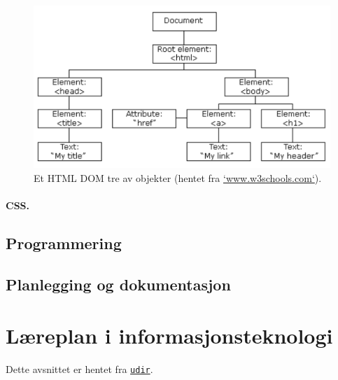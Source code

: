 \documentclass[%
oneside,                 %
final,                   %
12pt]{article}
\begin{document}
\begin{figure}[t]
  \centerline{\includegraphics[width=0.9\linewidth]{figures/pic_htmltree.pdf}}
  \caption{
  Et HTML DOM tre av objekter (hentet fra \href{{http://www.w3schools.com/js/js_htmldom.asp}}{\protect `www.w3schools.com`}). \label{figure:domtree}
  }
\end{figure}




\paragraph{CSS.}
\label{section:teori:css} 


\subsection{Programmering}
\label{section:teori:programmering}

\subsection{Planlegging og dokumentasjon}
\label{section:teori:planlegging}


\pagebreak

\section{Læreplan i informasjonsteknologi}

Dette avsnittet er hentet fra \href{{http://www.udir.no/kl06/inf1-01/Hele}}{\nolinkurl{udir}}.
\end{document}
